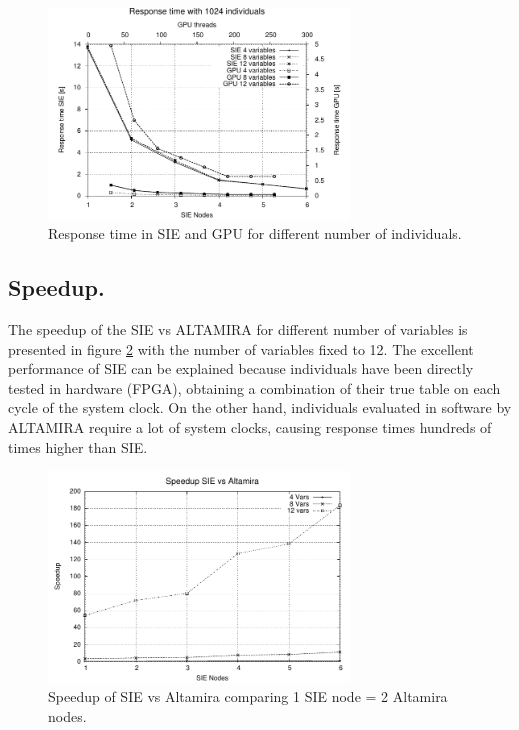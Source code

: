 \documentclass[runningheads,a4paper]{llncs}
\begin{document}
\begin{figure}[h!]
\begin{center} 
\includegraphics[width=8cm]{./images/response_time_1024indiv_gpu} 
\end{center}
\caption{Response time in SIE and GPU for different number of individuals.}
\label{fig:rt_indv2}
\end{figure}



\subsection{Speedup.}
The speedup of the SIE vs ALTAMIRA for different number of variables is presented in figure \ref{fig:speedup1} with the number of variables fixed to 12. The excellent performance of SIE can be explained because individuals have been directly tested in hardware (FPGA), obtaining a combination of their true table on each cycle of the system clock. On the other hand, individuals evaluated in software by ALTAMIRA require a lot of system clocks, causing response times hundreds of times higher than SIE.                                                     

\begin{figure}[h!]
\begin{center} 
\includegraphics[width=8cm]{./images/speedup_sie_vs_altamira} 
\end{center}
\caption{Speedup of SIE vs Altamira comparing 1 SIE node = 2 Altamira nodes.}
\label{fig:speedup1}
\end{figure}
\end{document}
